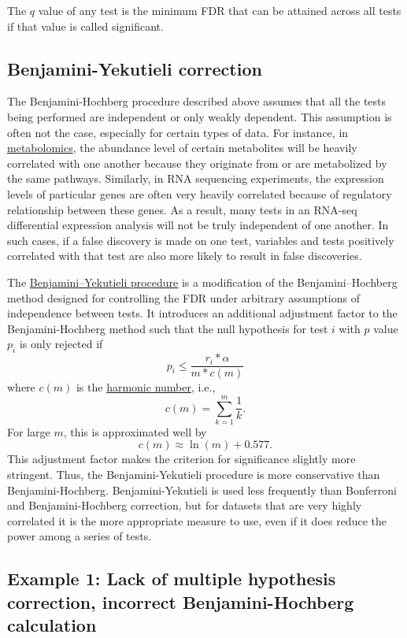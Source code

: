 \documentclass[letterpaper, 12pt]{article}
\begin{document}
The $q$ value of any test is the minimum FDR that can be attained across all tests if that value is called significant.

\subsection*{Benjamini-Yekutieli correction}

The Benjamini-Hochberg procedure described above assumes that all the tests being performed are independent or only weakly dependent. This assumption is often not the case, especially for certain types of data. For instance, in \href{https://en.wikipedia.org/wiki/Metabolomics}{metabolomics}, the abundance level of certain metabolites will be heavily correlated with one another because they originate from or are metabolized by the same pathways. Similarly, in RNA sequencing experiments, the expression levels of particular genes are often very heavily correlated because of regulatory relationship between these genes. As a result, many tests in an RNA-seq differential expression analysis will not be truly independent of one another. In such cases, if a false discovery is made on one test, variables and tests positively correlated with that test are also more likely to result in false discoveries.

The \href{https://doi.org/10.1214%2Faos%2F1013699998}{Benjamini–Yekutieli procedure} is a modification of the Benjamini–Hochberg method designed for controlling the FDR under arbitrary assumptions of independence between tests. It introduces an additional adjustment factor to the Benjamini-Hochberg method such that the null hypothesis for test $i$ with $p$ value $p_i$ is only rejected if
$$p_i \leq \frac{r_i * \alpha}{m*c(m)}$$
where $c(m)$ is the \href{https://en.wikipedia.org/wiki/Harmonic_number}{harmonic number}, i.e.,
$$c(m) = \sum_{k=1}^m \frac{1}{k}.$$
For large $m$, this is approximated well by
$$c(m) \approx \ln(m) + 0.577.$$
This adjustment factor makes the criterion for significance slightly more stringent. Thus, the Benjamini-Yekutieli procedure is more conservative than Benjamini-Hochberg. Benjamini-Yekutieli is used less frequently than Bonferroni and Benjamini-Hochberg correction, but for datasets that are very highly correlated it is the more appropriate measure to use, even if it does reduce the power among a series of tests.

\subsection*{Example 1: Lack of multiple hypothesis correction, incorrect Benjamini-Hochberg calculation}
\end{document}
